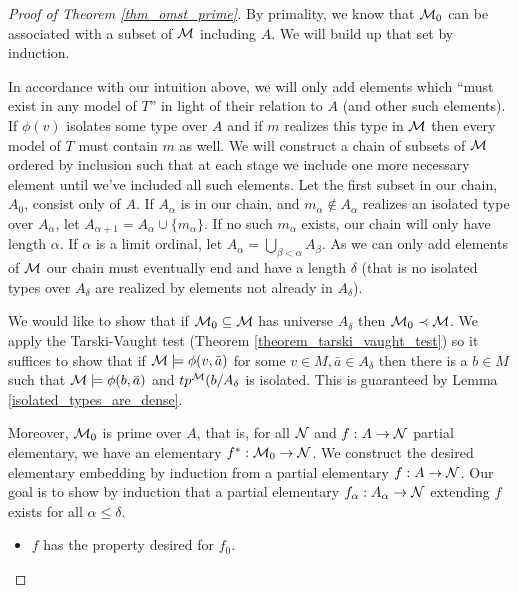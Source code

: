 \begin{proof}[Proof of Theorem \ref{thm_omst_prime}]\label{proof_omst_prime} 
By primality, we know that \(\mathcal{M}_0\) can be associated with a subset of \(\mathcal{M}\) including \(A\). 
We will build up that set by induction. 

In accordance with our intuition above, we will only add elements which ``must exist in any model of \(T\)'' in light of their relation to \(A\) (and other such elements).
If \(\phi(v)\) isolates some type over \(A\) and if \(m\) realizes this type in \(\mathcal{M}\) then every model of \(T\) must contain \(m\) as well. 
We will construct a chain of subsets of \(\mathcal{M}\) ordered by inclusion such that at each stage we include one more necessary element until we've included all such elements. 
Let the first subset in our chain, \(A_0\), consist only of \(A\). 
If \(A_\alpha\) is in our chain, and \(m_\alpha \notin A_\alpha\) realizes an isolated type over \(A_\alpha\), let \(A_{\alpha+1} = A_\alpha \cup \{m_\alpha\}\).
If no such \(m_\alpha\) exists, our chain will only have length \(\alpha\). 
If \(\alpha\) is a limit ordinal, let \(A_\alpha = \bigcup\limits_{\beta < \alpha} A_\beta\). 
As we can only add elements of \(\mathcal{M}\) our chain must eventually end and have a length \(\delta\) (that is no isolated types over \(A_\delta\) are realized by elements not already in \(A_\delta\)).

We would like to show that if \(\mathcal{M}_0 \subseteq \mathcal{M}\) has universe \(A_\delta\) then \(\mathcal{M}_0 \prec \mathcal{M}\).
We apply the Tarski-Vaught test (Theorem \ref{theorem_tarski_vaught_test}) so it suffices to show that if \(\mathcal{M} \models \phi(v, \bar{a})\) for some \(v \in M, \bar{a} \in A_\delta\) then there is a \(b \in M\) such that \(\mathcal{M} \models \phi(b, \bar{a})\) and \(tp^{\mathcal{M}}(b/A_\delta\) is isolated. 
This is guaranteed by Lemma \ref{isolated_types_are_dense}.

Moreover, \(\mathcal{M}_0\) is prime over \(A\), that is, for all \(\mathcal{N}\) and \(f: A \to \mathcal{N}\) partial elementary, we have an elementary \(f^*: \mathcal{M}_0 \to \mathcal{N}\). 
We construct the desired elementary embedding by induction from a partial elementary \(f: A \to \mathcal{N}\).  
Our goal is to show by induction that a partial elementary \(f_\alpha:A_\alpha \to \mathcal{N}\) extending \(f\) exists for all \(\alpha \leq \delta\). 

\begin{itemize}
\item \(f\) has the property desired for \(f_0\). 


\end{itemize}
\end{proof}
